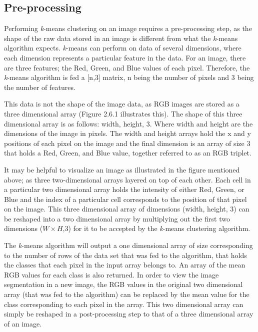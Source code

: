 \documentclass[12pt]{article}
\begin{document}
\subsection {Pre-processing}
  \par Performing \textit{k}-means clustering on an image requires a pre-processing step, as the shape of the raw data stored in an image is different from what the \textit{k}-means algorithm expects. \textit{k}-means can perform on data of several dimensions, where each dimension represents a particular feature in the data. For an image, there are three features; the Red, Green, and Blue values of each pixel. Therefore, the \textit{k}-means algorithm is fed a [n,3] matrix, n being the number of pixels and 3 being the number of features.

  \pagebreak
  
  \par This data is not the shape of the image data, as RGB images are stored as a three dimensional array (Figure 2.6.1 illustrates this). The shape of this three dimensional array is as follows: width, height, 3. Where width and height are the dimensions of the image in pixels. The width and height arrays hold the x and y positions of each pixel on the image and the final dimension is an array of size 3 that holds a Red, Green, and Blue value, together referred to as an RGB triplet.

  \par It may be helpful to visualize an image as illustrated in the figure mentioned above; as three two-dimensional arrays layered on top of each other. Each cell in a particular two dimensional array holds the intensity of either Red, Green, or Blue and the index of a particular cell corresponds to the position of that pixel on the image. This three dimensional array of dimensions (width, height, 3) can be reshaped into a two dimensional array by multiplying out the first two dimensions ($W\times H$,3) for it to be accepted by the \textit{k}-means clustering algorithm.

  \par The \textit{k}-means algorithm will output a one dimensional array of size corresponding to the number of rows of the data set that was fed to the algorithm, that holds the classes that each pixel in the input array belongs to. An array of the mean RGB values for each class is also returned. In order to view the image segmentation in a new image, the RGB values in the original two dimensional array (that was fed to the algorithm) can be replaced by the mean value for the class corresponding to each pixel in the array. This two dimensional array can simply be reshaped in a post-processing step to that of a three dimensional array of an image.
\end{document}
